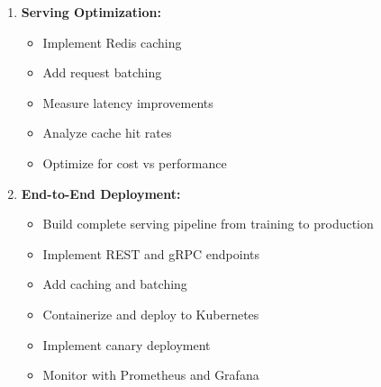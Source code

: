 \begin{enumerate}
    \item \textbf{Serving Optimization:}
    \begin{itemize}
        \item Implement Redis caching
        \item Add request batching
        \item Measure latency improvements
        \item Analyze cache hit rates
        \item Optimize for cost vs performance
    \end{itemize}

    \item \textbf{End-to-End Deployment:}
    \begin{itemize}
        \item Build complete serving pipeline from training to production
        \item Implement REST and gRPC endpoints
        \item Add caching and batching
        \item Containerize and deploy to Kubernetes
        \item Implement canary deployment
        \item Monitor with Prometheus and Grafana
    \end{itemize}
\end{enumerate}
